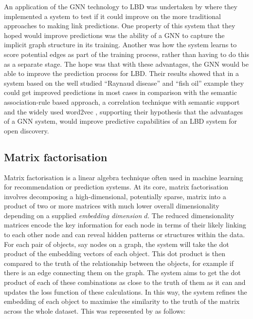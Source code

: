 \documentclass{l4proj}
\begin{document}
An application of the GNN technology to LBD was undertaken by \cite{ding_exploring_2021} where they implemented a system to test if it could improve on the more traditional approaches to making link predictions. One property of this system that they hoped would improve predictions was the ability of a GNN to capture the implicit graph structure in its training. Another was how the system learns to score potential edges as part of the training process, rather than having to do this as a separate stage. The hope was that with these advantages, the GNN would be able to improve the prediction process for LBD. Their results showed that in a system based on the well studied ``Raynaud disease'' and ``fish oil'' example they could get improved predictions in most cases in comparison with the semantic association-rule based approach, a correlation technique with semantic support and the widely used  word2vec \citep{mikolov_distributed_2013}, supporting their hypothesis that the advantages of a GNN system, would improve predictive capabilities of an LBD system for open discovery. \\

\subsection{Matrix factorisation}

Matrix factorisation is a linear algebra technique often used in machine learning for recommendation or prediction systems. At its core, matrix factorisation involves decomposing a high-dimensional, potentially sparse, matrix into a product of two or more matrices with much lower overall dimensionality depending on a supplied \textit{embedding dimension} $d$. The reduced dimensionality matrices encode the key information for each node in terms of their likely linking to each other node and can reveal hidden patterns or structures within the data. For each pair of objects, say nodes on a graph, the system will take the dot product of the embedding vectors of each object. This dot product is then compared to the truth of the relationship between the objects, for example if there is an edge connecting them on the graph. The system aims to get the dot product of each of these combinations as close to the truth of them as it can and updates the loss function of these calculations. In this way, the system refines the embedding of each object to maximise the similarity to the truth of the matrix across the whole dataset. This was represented by \cite{matrix_fact} as follows:\\
\end{document}
